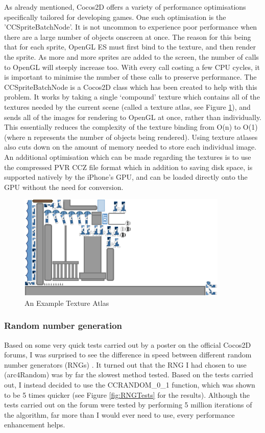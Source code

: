 \documentclass[a4paper,oneside]{report}
\begin{document}
As already mentioned, Cocos2D offers a variety of performance optimisations specifically tailored for developing games. One such optimisation is the 'CCSpriteBatchNode'. It is not uncommon to experience poor performance when there are a large number of objects onscreen at once. The reason for this being that for each sprite, OpenGL ES must first bind to the texture, and then render the sprite. As more and more sprites are added to the screen, the number of calls to OpenGL will steeply increase too. With every call costing a few CPU cycles, it is important to minimise the number of these calls to preserve performance. The CCSpriteBatchNode is a Cocos2D class which has been created to help with this problem. It works by taking a single `compound' texture which contains all of the textures needed by the current scene (called a texture atlas, see Figure \ref{fig:TextureAtlas}), and sends all of the images for rendering to OpenGL at once, rather than individually. This essentially reduces the complexity of the texture binding from O(n) to O(1) (where n represents the number of objects being rendered). Using texture atlases also cuts down on the amount of memory needed to store each individual image. An additional optimisation which can be made regarding the textures is to use the compressed PVR CCZ file format which in addition to saving disk space, is supported natively by the iPhone's GPU, and can be loaded directly onto the GPU without the need for conversion.

\begin{figure}[h!]
  \centering
    \includegraphics[width=100mm]{sources/images/Texture_atlas}
    \caption{An Example Texture Atlas}
    \label{fig:TextureAtlas}
\end{figure}

\subsubsection{Random number generation} 

Based on some very quick tests carried out by a poster on the official Cocos2D forums, I was surprised to see the difference in speed between different random number generators (RNGs) \cite{:2011zt}. It turned out that the RNG I had chosen to use (arc4Random) was by far the slowest method tested. Based on the tests carried out, I instead decided to use the CCRANDOM\_0\_1 function, which was shown to be 5 times quicker (see Figure \ref{fig:RNGTests} for the results). Although the tests carried out on the forum were tested by performing 5 million iterations of the algorithm, far more than I would ever need to use, every performance enhancement helps.
	
\end{document}
